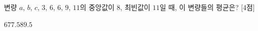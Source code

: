 변량 $a$, $b$, $c$, $3$, $6$, $6$, $9$, $11$의 중앙값이 $8$, 최빈값이 $11$일 때, 이 변량들의 평균은? \mbox{[4점]}
\begin{choices32}{$6$}{$7$}{$7.5$}{$8$}{$9.5$}\end{choices32}
